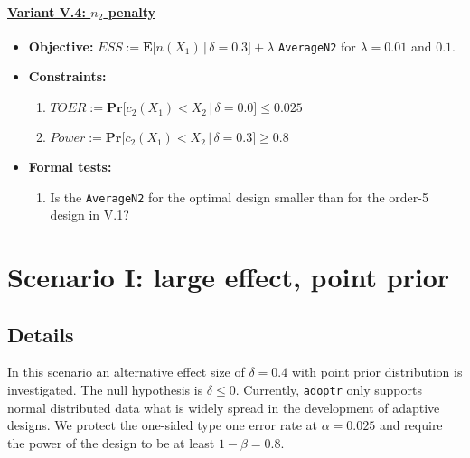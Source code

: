 \documentclass[]{book}
\providecommand{\tightlist}{%
  \setlength{\itemsep}{0pt}\setlength{\parskip}{0pt}}
\begin{document}
\hypertarget{variant-v.4-n_2-penalty}{%
\subsubsection{\texorpdfstring{\protect\hyperlink{variantV_4}{Variant V.4: \(n_2\) penalty}}{Variant V.4: n\_2 penalty}}\label{variant-v.4-n_2-penalty}}

\begin{itemize}
\tightlist
\item
  \textbf{Objective:} \(ESS := \boldsymbol{E}\big[n(X_1)\,|\,\delta=0.3\big] + \lambda\) \texttt{AverageN2}
  for \(\lambda = 0.01\) and \(0.1\).
\item
  \textbf{Constraints:}

  \begin{enumerate}
  \def\labelenumi{\arabic{enumi}.}
  \tightlist
  \item
    \(TOER := \boldsymbol{Pr}\big[c_2(X_1) < X_2\,|\,\delta=0.0\big] \leq 0.025\)
  \item
    \(Power := \boldsymbol{Pr}\big[c_2(X_1) < X_2\,|\,\delta=0.3\big] \geq 0.8\)
  \end{enumerate}
\item
  \textbf{Formal tests:}

  \begin{enumerate}
  \def\labelenumi{\arabic{enumi}.}
  \tightlist
  \item
    Is the \texttt{AverageN2} for the optimal design smaller than for the order-5
    design in V.1?
  \end{enumerate}
\end{itemize}

\hypertarget{scenarioI}{%
\chapter{Scenario I: large effect, point prior}\label{scenarioI}}

\hypertarget{details}{%
\section{Details}\label{details}}

In this scenario an alternative effect size of \(\delta = 0.4\) with
point prior distribution is investigated.
The null hypothesis is \(\delta \leq 0\).
Currently, \texttt{adoptr} only supports normal distributed data what is widely spread
in the development of adaptive designs.
We protect the one-sided type one error rate at \(\alpha = 0.025\) and require
the power of the design to be at least \(1 - \beta = 0.8\).
\end{document}
